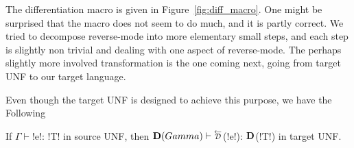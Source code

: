 The differentiation macro is given in Figure~\ref{fig:diff_macro}.
One might be surprised that the macro does not seem to do much, and it is partly correct.
We tried to decompose reverse-mode into more elementary small steps, and each step is slightly non trivial and dealing with one aspect of reverse-mode.
The perhaps slightly more involved transformation is the one coming next,  going from target UNF to our target language.



Even though the target UNF is designed to achieve this purpose, we have the Following

\begin{proposition}
    If $\Gamma \vdash$!e!: !T! in source UNF, then
    $\Dtype(Gamma)\vdash \Dsynrevsymbol$(!e!):  $\mathbf{D}$(!T!) in target UNF.
\end{proposition}

